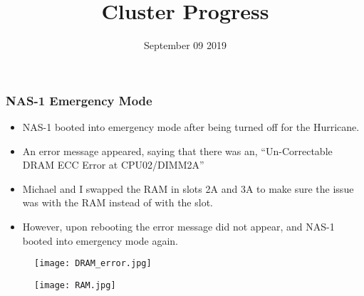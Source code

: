 \documentclass{beamer}
\title{Cluster Progress}
\date{September 09 2019}
\begin{document}

\begin{frame}
  \maketitle
\end{frame}



\begin{frame}
  \frametitle{NAS-1 Emergency Mode}

  \begin{itemize}
  \item NAS-1 booted into emergency mode after being turned off for the Hurricane.
  \item An error message appeared, saying that there was an, ``Un-Correctable DRAM ECC Error at CPU02/DIMM2A''
  \item Michael and I swapped the RAM in slots 2A and 3A to make sure the issue was with the RAM instead of with the slot.
  \item However, upon rebooting the error message did not appear, and NAS-1 booted into emergency mode again.
  \end{itemize}

  \begin{figure}[H]
    \begin{center}
      \texttt{[image: DRAM\_error.jpg]}
    \end{center}
  \end{figure}

  \begin{figure}[H]
    \begin{center}
      \texttt{[image: RAM.jpg]}
    \end{center}
  \end{figure}


\end{frame}


\end{document}

